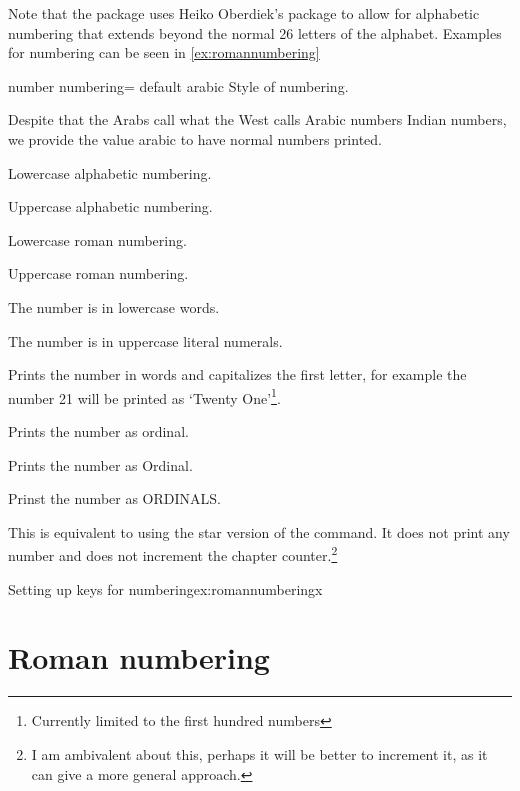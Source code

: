 Note that the package uses Heiko Oberdiek's package  to allow for alphabetic numbering that extends beyond the normal 26 letters of the alphabet. Examples for numbering can be seen in \ref{ex:romannumbering}


\begin{docKey}{number numbering}{= }{default arabic}
Style of numbering.
\end{docKey}

\begin{marglist}
\item [arabic] Despite that the Arabs call what the West calls Arabic numbers Indian numbers, we provide the value arabic to have normal numbers printed.
\item [alph] Lowercase alphabetic numbering.
\item [Alph] Uppercase alphabetic numbering.
\item [roman] Lowercase roman numbering.
\item [Roman] Uppercase roman numbering.
\item [words] The number is in lowercase words.
\item [WORDS] The number is in uppercase literal numerals.
\item [Words] Prints the number in words and capitalizes the first letter, for example the number 21 will be printed as `Twenty One'\footnote{Currently limited to the first hundred numbers}.
\item [ordinals] Prints the number as ordinal.
\item [Ordinals] Prints the number as Ordinal.
\item [ORDINALS] Prinst the number as ORDINALS.
\item [none] This is equivalent to using the star version of the command. It does not print any number and does not increment the chapter counter.\footnote{I am ambivalent about this, perhaps it will be better to increment it, as it can give a more general approach.}
\end{marglist}


\begin{texexample}{Setting up keys for numbering}{ex:romannumberingx}
\bgroup
{}
\chapter{Roman numbering}
\lorem
\egroup
\end{texexample}



